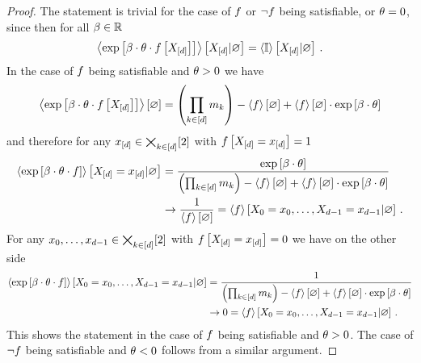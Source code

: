 \begin{proof}
    The statement is trivial for the case of $f$ or $\lnot f$ being satisfiable, or $\theta=0$, since then for all $\beta\in\mathbb{R}$
    \begin{align*}
        \left\langle \mathrm{exp}\left[\beta\cdot\theta\cdot f\left[X_{[d]}\right]\right]\right\rangle \left[ X_{[d]} | \varnothing \right] = \left\langle \mathbb{I}\right\rangle \left[ X_{[d]} | \varnothing \right] \, .
    \end{align*}
    In the case of $f$ being satisfiable and $\theta>0$ we have
    \begin{align*}
        \left\langle \mathrm{exp}\left[\beta\cdot\theta\cdot f\left[X_{[d]}\right]\right]\right\rangle \left[ \varnothing \right]
        = \left(\prod_{k\in[d]} m_{k}\right) - \left\langle f\right\rangle \left[ \varnothing \right] + \left\langle f\right\rangle \left[ \varnothing \right] \cdot \mathrm{exp}\left[\beta\cdot\theta\right]
    \end{align*}
    and therefore for any $x_{[d]}\in\bigtimes_{k\in[d]}[2]$ with $f\left[X_{[d]}=x_{[d]}\right]=1$
    \begin{align*}
        \left\langle \mathrm{exp}\left[\beta\cdot\theta\cdot f\right]\right\rangle \left[ X_{[d]}=x_{[d]} | \varnothing \right]
        &= \frac{
            \mathrm{exp}\left[\beta\cdot\theta\right]
        }{
            \left(\prod_{k\in[d]} m_{k} \right) - \left\langle f\right\rangle \left[ \varnothing \right] + \left\langle f\right\rangle \left[ \varnothing \right] \cdot \mathrm{exp}\left[\beta\cdot\theta\right]
        } \\
        & \rightarrow \frac{1}{\left\langle f\right\rangle \left[ \varnothing \right]}
        = \left\langle f\right\rangle \left[ X_{0}=x_{0},\ldots,X_{d-1}=x_{d-1} | \varnothing \right] \, .
    \end{align*}
    For any ${x_{0},\ldots,x_{d-1}}\in\bigtimes_{k\in[d]}[2]$ with $f\left[X_{[d]}=x_{[d]}\right]=0$ we have on the other side
    \begin{align*}
        \left\langle \mathrm{exp}\left[\beta\cdot\theta\cdot f\right]\right\rangle \left[ X_{0}=x_{0},\ldots,X_{d-1}=x_{d-1} | \varnothing \right]
        &= \frac{
            1
        }{
            \left(\prod_{k\in[d]} m_{k}\right) - \left\langle f\right\rangle \left[ \varnothing \right] + \left\langle f\right\rangle \left[ \varnothing \right] \cdot \mathrm{exp}\left[\beta\cdot\theta\right]
        } \\
        & \rightarrow 0
        = \left\langle f\right\rangle \left[ X_{0}=x_{0},\ldots,X_{d-1}=x_{d-1} | \varnothing \right] \, .
    \end{align*}
    This shows the statement in the case of $f$ being satisfiable and $\theta>0$.
    The case of $\lnot f$ being satisfiable and $\theta<0$ follows from a similar argument.
\end{proof}

